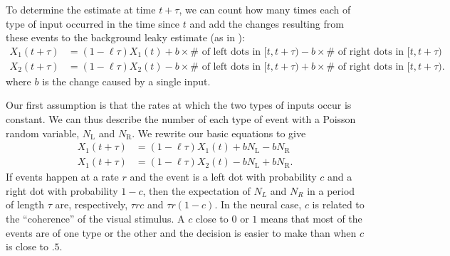 \documentclass{article}
\begin{document}
To determine the estimate at time $t+\tau$, we can count how many times each of type of input occurred in the time since $t$ and add the changes resulting from these events to the background leaky estimate (as in \cite{Gillespie:2000fk}):
\begin{align*}
X_1(t+\tau)&=(1-\ell\tau)X_1(t)+b\times\# \text{ of left dots in }[t,t+\tau)-b\times\# \text{ of right dots in }[t,t+\tau)
\\ X_2(t+\tau)&=(1-\ell\tau)X_2(t)-b\times\# \text{ of left dots in }[t,t+\tau)+b\times\# \text{ of right dots in }[t,t+\tau). 
\end{align*}
where $b$ is the change caused by a single input.

Our first assumption is that the rates at which the two types of inputs occur is constant.  We can thus describe the number of each type of event with a Poisson random variable, $N_\text{L}$ and $N_\text{R}$.  We rewrite our basic equations to give 
\begin{align*}
X_1(t+\tau)&=(1-\ell\tau)X_1(t)+bN_\text{L}-bN_\text{R}
\\ X_1(t+\tau)&=(1-\ell\tau)X_2(t)-bN_\text{L}+bN_\text{R}.
\end{align*}
If events happen at a rate $r$ and the event is a left dot with probability $c$ and a right dot with probability $1-c$, then the expectation of $N_L$ and $N_R$ in a period of length $\tau$ are, respectively, $\tau r c$ and $\tau r(1-c)$. In the neural case, $c$ is related to the ``coherence'' of the visual stimulus.  A $c$ close to $0$ or $1$ means that most of the events are of one type or the other and the decision is easier to make than when $c$ is close to $.5$.
\end{document}

